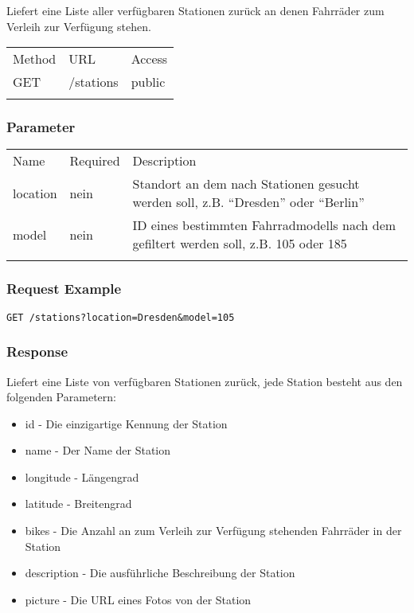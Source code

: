 Liefert eine Liste aller verfügbaren Stationen zurück an denen Fahrräder
zum Verleih zur Verfügung stehen.

\begin{longtable}[c]{@{}lll@{}}
\toprule\addlinespace
Method & URL & Access
\\\addlinespace
\midrule\endhead
GET & /stations & public
\\\addlinespace
\bottomrule
\end{longtable}

\subsubsection{Parameter}\label{parameter}

\begin{longtable}[c]{@{}lll@{}}
\toprule\addlinespace
Name & Required & Description
\\\addlinespace
\midrule\endhead
location & nein & Standort an dem nach Stationen gesucht werden soll,
z.B. ``Dresden'' oder ``Berlin''
\\\addlinespace
model & nein & ID eines bestimmten Fahrradmodells nach dem gefiltert
werden soll, z.B. 105 oder 185
\\\addlinespace
\bottomrule
\end{longtable}

\subsubsection{Request Example}\label{request-example}

\begin{verbatim}
GET /stations?location=Dresden&model=105
\end{verbatim}

\subsubsection{Response}\label{response}

Liefert eine Liste von verfügbaren Stationen zurück, jede Station besteht aus den folgenden Parametern: 
\begin{itemize}
\item id - Die einzigartige Kennung der Station
\item name - Der Name der Station
\item longitude - Längengrad
\item latitude - Breitengrad
\item bikes - Die Anzahl an zum Verleih zur Verfügung stehenden Fahrräder in der Station
\item description - Die ausführliche Beschreibung der Station
\item picture - Die URL eines Fotos von der Station
\end{itemize}


